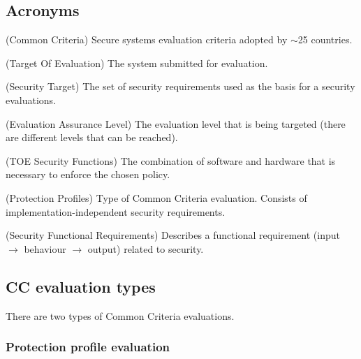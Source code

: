 \documentclass[10pt]{article}
\begin{document}
    \subsection{Acronyms}

    \begin{description}[style=multiline,leftmargin=1.7cm]
      \item[CC]{
          (Common Criteria) Secure systems evaluation criteria adopted by
          $\sim$25 countries.
      }
      \item[TOE]{
          (Target Of Evaluation) The system submitted for evaluation.
      }
      \item[ST]{
          (Security Target) The set of security requirements used as the basis
          for a security evaluations.
      }
      \item[EAL]{
          (Evaluation Assurance Level) The evaluation level that is being
          targeted (there are different levels that can be reached).
      }
      \item[TSF]{
          (TOE Security Functions) The combination of software and hardware
          that is necessary to enforce the chosen policy.
      }
      \item[PP]{
          (Protection Profiles) Type of Common Criteria evaluation. Consists of
          implementation-independent security requirements.
      }
      \item[SFR]{
          (Security Functional Requirements) Describes a functional requirement
          (input $\rightarrow$ behaviour $\rightarrow$ output) related to
          security.
      }
    \end{description}

    \subsection{CC evaluation types}

      There are two types of Common Criteria evaluations.

      \subsubsection{Protection profile evaluation}
\end{document}
